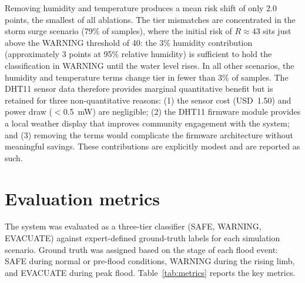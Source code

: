 \documentclass[5p,twocolumn]{elsarticle}
\begin{document}
Removing humidity and temperature produces a mean risk shift of only 2.0 points, the smallest of all ablations. The tier mismatches are concentrated in the storm surge scenario (79\% of samples), where the initial risk of $R \approx 43$ sits just above the WARNING threshold of 40: the 3\% humidity contribution (approximately 3 points at 95\% relative humidity) is sufficient to hold the classification in WARNING until the water level rises. In all other scenarios, the humidity and temperature terms change tier in fewer than 3\% of samples. The DHT11 sensor data therefore provides marginal quantitative benefit but is retained for three non-quantitative reasons: (1) the sensor cost (USD~1.50) and power draw ($<$0.5~mW) are negligible; (2) the DHT11 firmware module provides a local weather display that improves community engagement with the system; and (3) removing the terms would complicate the firmware architecture without meaningful savings. These contributions are explicitly modest and are reported as such.

\section{Evaluation metrics}

The system was evaluated as a three-tier classifier (SAFE, WARNING, EVACUATE) against expert-defined ground-truth labels for each simulation scenario. Ground truth was assigned based on the stage of each flood event: SAFE during normal or pre-flood conditions, WARNING during the rising limb, and EVACUATE during peak flood. Table~\ref{tab:metrics} reports the key metrics.
\end{document}
